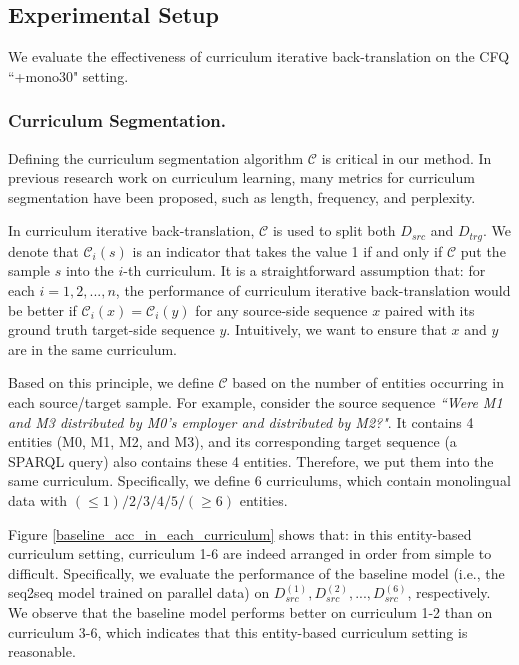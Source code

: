 \documentclass[letterpaper]{article} %
\begin{document}
\subsection{Experimental Setup}
We evaluate the effectiveness of curriculum iterative back-translation on the CFQ ``+mono30" setting.

\subsubsection{Curriculum Segmentation.}
Defining the curriculum segmentation algorithm $\mathcal{C}$ is critical in our method.
In previous research work on curriculum learning, many metrics for curriculum segmentation have been proposed, such as length, frequency, and perplexity.

In curriculum iterative back-translation, $\mathcal{C}$ is used to split both $D_{src}$ and $D_{trg}$.
We denote that $\mathcal{C}_i(s)$ is an indicator that takes the value 1 if and only if $\mathcal{C}$ put the sample $s$ into the $i$-th curriculum.
It is a straightforward assumption that: for each $i = 1, 2, ..., n$, the performance of curriculum iterative back-translation would be better if $\mathcal{C}_i(x)=\mathcal{C}_i(y)$ for any source-side sequence $x$ paired with its ground truth target-side sequence $y$.
Intuitively, we want to ensure that $x$ and $y$ are in the same curriculum.

Based on this principle, we define $\mathcal{C}$ based on the number of entities occurring in each source/target sample.
For example, consider the source sequence \textit{``Were M1 and M3 distributed by M0's employer and distributed by M2?"}.
It contains 4 entities (M0, M1, M2, and M3), and its corresponding target sequence (a SPARQL query) also contains these 4 entities.
Therefore, we put them into the same curriculum.
Specifically, we define 6 curriculums, which contain monolingual data with $(\leq 1) / 2 / 3 / 4 / 5 / (\geq 6)$ entities.


Figure \ref{baseline_acc_in_each_curriculum} shows that: in this entity-based curriculum setting, curriculum 1-6 are indeed arranged in order from simple to difficult.
Specifically, we evaluate the performance of the baseline model (i.e., the seq2seq model trained on parallel data) on $D_{src}^{(1)}, D_{src}^{(2)}, ..., D_{src}^{(6)}$, respectively.
We observe that the baseline model performs better on curriculum 1-2 than on curriculum 3-6, which indicates that this entity-based curriculum setting is reasonable.
\end{document}
